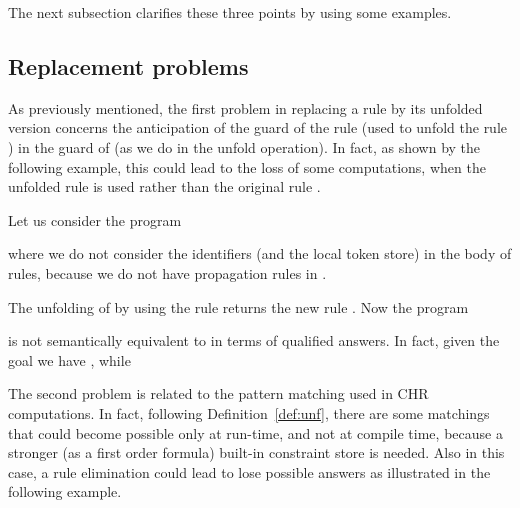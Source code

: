 \documentclass{tlp}
\begin{document}
The next
subsection clarifies these three points by using some examples.

\subsection{Replacement problems}

As previously mentioned, the first problem in replacing a rule by its unfolded version concerns the anticipation of
the guard of the rule  (used to unfold the rule ) in the guard of 
(as we do in the unfold operation). In fact, as shown by the following example, this could lead to the loss of some
computations,  when the unfolded rule   is used rather than the
original rule .

\begin{example}\label{esempio:mau}
Let us consider the program

where we do not consider the identifiers (and the local token store) in
the body of rules, because we do not have propagation rules in
.

The unfolding  of   by using the rule  returns the new
rule . Now the
program

is not semantically equivalent to  in terms of qualified
answers. In fact, given the goal  we have , while 
\end{example}


The second problem is related to the pattern matching used in CHR computations. In fact,
following Definition~\ref{def:unf}, there are some matchings that could become
possible only at run-time, and not at compile time, because a stronger (as a first order formula)
built-in constraint store is needed. Also in this case, a rule elimination could lead to lose
possible answers as illustrated in the following example.
\end{document}
